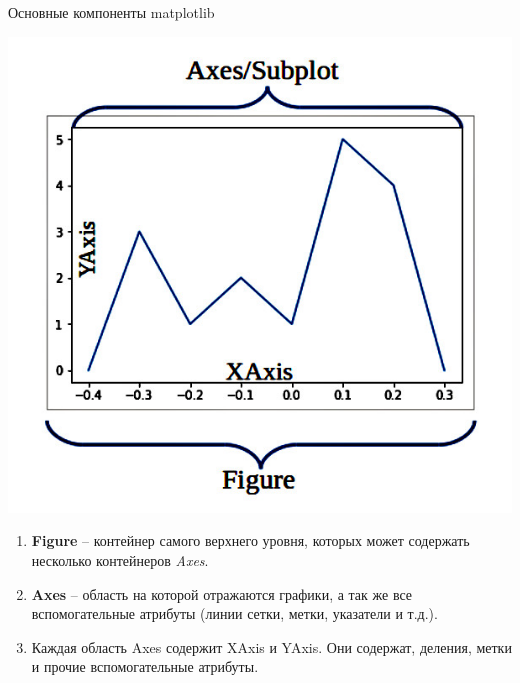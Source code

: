 \documentclass[12pt]{beamer}
\begin{document}
\begin{frame}{Основные компоненты matplotlib}

\begin{minipage}{0.35\textwidth}
  \begin{flushleft}
	\includegraphics[scale=0.2]{image/mpl_anatomy.jpg}
	\vspace{2.2cm}
  \end{flushleft}
\end{minipage}
\begin{minipage}{0.6\textwidth}
  \begin{flushright}
	\begin{enumerate}
		\item \textbf{Figure} -- контейнер самого верхнего уровня, которых может содержать несколько контейнеров \textit{Axes}. 
		\item \textbf{Axes} -- область на которой отражаются графики, а так же все вспомогательные атрибуты (линии сетки, метки, указатели и т.д.).
		\item Каждая область Axes содержит XAxis и YAxis. Они содержат, деления, метки и прочие вспомогательные атрибуты. 
\end{enumerate}
  \end{flushright}
\end{minipage}

\end{frame}
\end{document}
